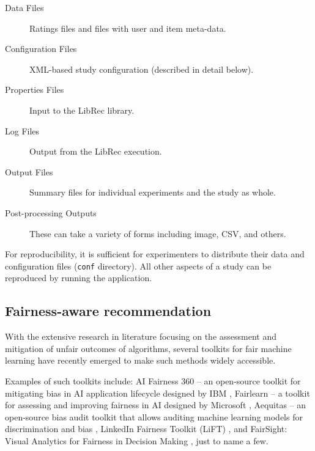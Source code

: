 \begin{description}
    \item[Data Files] Ratings files and files with user and item meta-data.
    \item[Configuration Files] XML-based study configuration (described in detail below).
    \item[Properties Files] Input to the LibRec library.
    \item[Log Files] Output from the LibRec execution.
    \item[Output Files] Summary files for individual experiments and the study as whole.
    \item[Post-processing Outputs] These can take a variety of forms including image, CSV, and others.
\end{description}

For reproducibility, it is sufficient for experimenters to distribute their data and configuration files (\texttt{conf} directory). All other aspects of a study can be reproduced by running the \libauto{} application.

\subsection{Fairness-aware recommendation}
\label{subsec:libauto_fair_tools}

With the extensive research in literature focusing on the assessment and mitigation of unfair outcomes of algorithms, several toolkits for fair machine learning have recently emerged to make such methods widely accessible.

Examples of such toolkits include: AI Fairness 360 -- an open-source toolkit for mitigating bias in AI application lifecycle designed by IBM \cite{bellamy2019ai}, Fairlearn -- a toolkit for assessing and improving fairness in AI designed by Microsoft \cite{bird2020fairlearn}, Aequitas -- an open-source bias audit toolkit that allows auditing machine learning models for discrimination and bias \cite{saleiro2018aequitas}, LinkedIn Fairness Toolkit (LiFT) \cite{SriramLifT2020}, and FairSight: Visual Analytics for Fairness in Decision Making \cite{ahn2019fairsight}, just to name a few.

